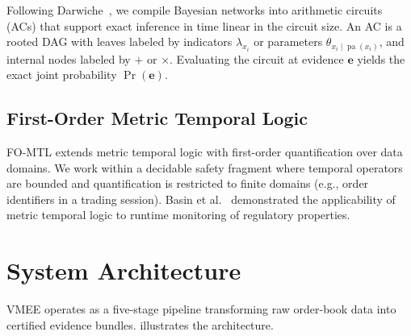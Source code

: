 \documentclass[11pt]{article}
\DeclareMathOperator{\Pr}{Pr}
\DeclareMathOperator{\pa}{pa}
\begin{document}
Following Darwiche~\cite{darwiche2003}, we compile Bayesian networks into arithmetic circuits (ACs) that support exact inference in time linear in the circuit size.
An AC is a rooted DAG with leaves labeled by indicators $\lambda_{x_i}$ or parameters $\theta_{x_i \mid \pa(x_i)}$, and internal nodes labeled by $+$ or $\times$.
Evaluating the circuit at evidence $\mathbf{e}$ yields the exact joint probability $\Pr(\mathbf{e})$.

\subsection{First-Order Metric Temporal Logic}

FO-MTL extends metric temporal logic with first-order quantification over data domains.
We work within a decidable safety fragment where temporal operators are bounded and quantification is restricted to finite domains (e.g., order identifiers in a trading session).
Basin et al.~\cite{basin2015} demonstrated the applicability of metric temporal logic to runtime monitoring of regulatory properties.

\section{System Architecture}
\label{sec:architecture}

VMEE operates as a five-stage pipeline transforming raw order-book data into certified evidence bundles.
 illustrates the architecture.
\end{document}

